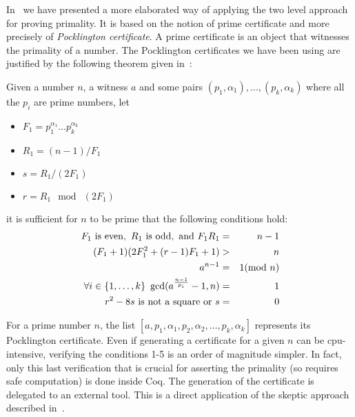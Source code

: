 In~\cite{GreTheWer} we have presented a more elaborated way of applying 
the two level approach for proving primality. It is based on the
notion of prime certificate and more precisely of {\it Pocklington certificate}.
A prime certificate is an object that witnesses the primality of a number.
The Pocklington certificates we have been using are justified by the following
theorem given in~\cite{lehmer}:
\begin{theorem}
Given a number $n$, a witness $a$ and some pairs $(p_1,\alpha_1),\dots,(p_k,\alpha_k)$
 where all the $p_i$ are prime numbers,
 let
 \begin{itemize}
\item[]$F_1 = p_1^{\alpha_1}\dots p_k^{\alpha_k}$
\item[]$R_1 = (n - 1) / F_1$
\item[]$ s = R_1 / (2F_1)$
\item[] $r = R_1 \mod\ (2F_1)$
 \end{itemize}
 it is sufficient for $n$ to be prime that the following conditions hold:
\begin{eqnarray}
F_1 \,\,\hbox{is even},\,\,
R_1 \,\, \hbox{is odd}, \,\,\hbox{and}\,\,
F_1R_1  &=&  n -1\\
(F_1 + 1) (2F_1^2 + (r - 1) F_1 + 1) & >& n\\
a^{n-1} &=& 1 (\mod\ n)\\
\forall i\in\{1,\dots,k\}~\gcd(a^{\frac{n-1}{p_i}}-1,n)&=&1\\
r^2 - 8 s\,\,\mbox{is not a square}\,\,\hbox{or}\,\,s &=& 0
\end{eqnarray}
\end{theorem}
For a prime number $n$, the list $[a, p_1, \alpha_1, p_2, \alpha_2, \dots, p_k, \alpha_k]$
represents its Pocklington certificate.
Even if generating a certificate for a given $n$ can be cpu-intensive, verifying
the conditions 1-5 is an order of magnitude simpler. In fact, only
this last verification that is crucial for asserting the primality (so requires
safe computation) is done inside {\sc Coq}.
The generation of the certificate is delegated to an external tool.
This is a direct application of the skeptic approach described in~\cite{BarBar,HarThe}.
                 
